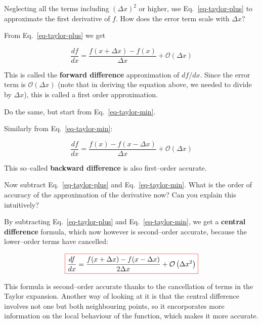 \begin{cue}
Neglecting all the terms including $\left(\Delta x\right)^2$ or higher, use Eq.~\ref{eq-taylor-plus} to approximate the first derivative of $f$. How does the error term scale with $\Delta x$? 
\end{cue}

From Eq.~\ref{eq-taylor-plus} we get

\begin{equation}
\frac{d f}{d x} = \frac{f(x+\Delta x) - f(x)}{\Delta x} + \mathcal{O}\left(\Delta x\right)
\end{equation} 

This is called the \textbf{forward difference} approximation of $df / dx$. Since the error term is $\mathcal{O}(\Delta x)$ (note that in deriving the equation above, we needed to divide by $\Delta x$), this is called a first order approximation.

\begin{cue}
Do the same, but start from Eq.~\ref{eq-taylor-min}.
\end{cue}

Similarly from Eq.~\ref{eq-taylor-min}:

\begin{equation}
\frac{d f}{d x} = \frac{f(x) - f(x- \Delta x)}{\Delta x} + \mathcal{O}\left(\Delta x\right)
\end{equation} 

This so--called \textbf{backward difference} is also first--order accurate.

\begin{cue}
Now subtract Eq.~\ref{eq-taylor-plus} and Eq.~\ref{eq-taylor-min}. What is the order of accuracy of the approximation of the derivative now? Can you explain this intuitively?
\end{cue}

By subtracting Eq.~\ref{eq-taylor-plus} and Eq.~\ref{eq-taylor-min}, we get a \textbf{central difference} formula, which now however is second--order accurate, because the lower--order terms have cancelled:

\begin{equation}
\fbox{$\displaystyle
\frac{d f}{d x} = \frac{f(x + \Delta x) - f(x- \Delta x)}{2 \Delta x} + \mathcal{O}\left(\Delta x^2\right)
$}
\end{equation} 

This formula is second--order accurate thanks to the cancellation of terms in the Taylor expansion. Another way of looking at it is that the central difference involves not one but both neighbouring points, so it encorporates more information on the local behaviour of the function, which makes it more accurate.

